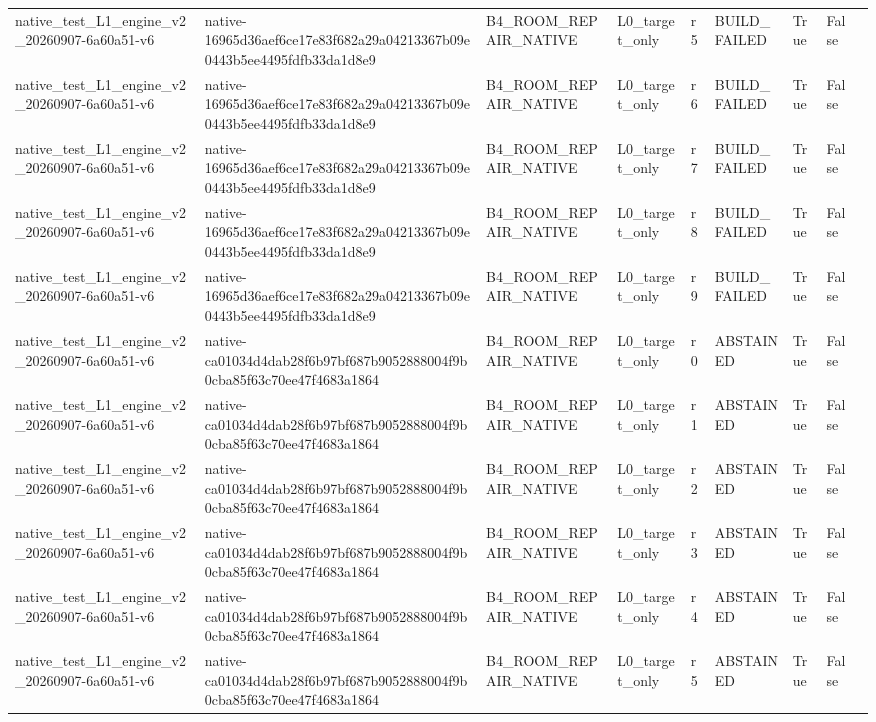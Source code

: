 \begin{tabular}{lllllllll}
native\_test\_L1\_engine\_v2\_20260907-6a60a51-v6 & native-16965d36aef6ce17e83f682a29a04213367b09e0443b5ee4495fdfb33da1d8e9 & B4\_ROOM\_REPAIR\_NATIVE & L0\_target\_only & r5 & BUILD\_FAILED & True & False &  \\
native\_test\_L1\_engine\_v2\_20260907-6a60a51-v6 & native-16965d36aef6ce17e83f682a29a04213367b09e0443b5ee4495fdfb33da1d8e9 & B4\_ROOM\_REPAIR\_NATIVE & L0\_target\_only & r6 & BUILD\_FAILED & True & False &  \\
native\_test\_L1\_engine\_v2\_20260907-6a60a51-v6 & native-16965d36aef6ce17e83f682a29a04213367b09e0443b5ee4495fdfb33da1d8e9 & B4\_ROOM\_REPAIR\_NATIVE & L0\_target\_only & r7 & BUILD\_FAILED & True & False &  \\
native\_test\_L1\_engine\_v2\_20260907-6a60a51-v6 & native-16965d36aef6ce17e83f682a29a04213367b09e0443b5ee4495fdfb33da1d8e9 & B4\_ROOM\_REPAIR\_NATIVE & L0\_target\_only & r8 & BUILD\_FAILED & True & False &  \\
native\_test\_L1\_engine\_v2\_20260907-6a60a51-v6 & native-16965d36aef6ce17e83f682a29a04213367b09e0443b5ee4495fdfb33da1d8e9 & B4\_ROOM\_REPAIR\_NATIVE & L0\_target\_only & r9 & BUILD\_FAILED & True & False &  \\
native\_test\_L1\_engine\_v2\_20260907-6a60a51-v6 & native-ca01034d4dab28f6b97bf687b9052888004f9b0cba85f63c70ee47f4683a1864 & B4\_ROOM\_REPAIR\_NATIVE & L0\_target\_only & r0 & ABSTAINED & True & False &  \\
native\_test\_L1\_engine\_v2\_20260907-6a60a51-v6 & native-ca01034d4dab28f6b97bf687b9052888004f9b0cba85f63c70ee47f4683a1864 & B4\_ROOM\_REPAIR\_NATIVE & L0\_target\_only & r1 & ABSTAINED & True & False &  \\
native\_test\_L1\_engine\_v2\_20260907-6a60a51-v6 & native-ca01034d4dab28f6b97bf687b9052888004f9b0cba85f63c70ee47f4683a1864 & B4\_ROOM\_REPAIR\_NATIVE & L0\_target\_only & r2 & ABSTAINED & True & False &  \\
native\_test\_L1\_engine\_v2\_20260907-6a60a51-v6 & native-ca01034d4dab28f6b97bf687b9052888004f9b0cba85f63c70ee47f4683a1864 & B4\_ROOM\_REPAIR\_NATIVE & L0\_target\_only & r3 & ABSTAINED & True & False &  \\
native\_test\_L1\_engine\_v2\_20260907-6a60a51-v6 & native-ca01034d4dab28f6b97bf687b9052888004f9b0cba85f63c70ee47f4683a1864 & B4\_ROOM\_REPAIR\_NATIVE & L0\_target\_only & r4 & ABSTAINED & True & False &  \\
native\_test\_L1\_engine\_v2\_20260907-6a60a51-v6 & native-ca01034d4dab28f6b97bf687b9052888004f9b0cba85f63c70ee47f4683a1864 & B4\_ROOM\_REPAIR\_NATIVE & L0\_target\_only & r5 & ABSTAINED & True & False &  \\

\end{tabular}
